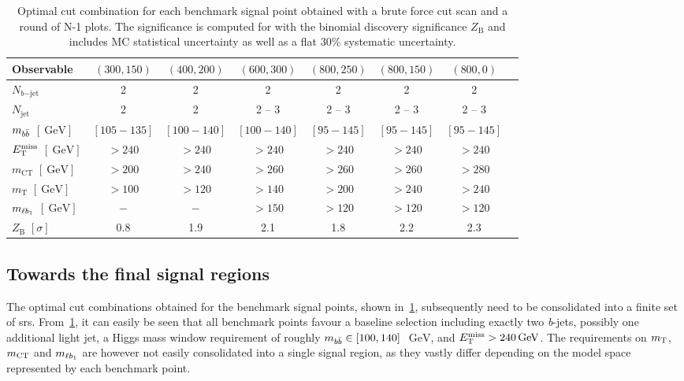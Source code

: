 \begin{table}
	\begin{center}
	\small
			\begin{tabular} {l c c c c c c c}
				\toprule
				Observable &  $(300,150)$ & $(400,200)$ & $(600,300)$  & $(800,250)$ & $(800,150)$ & $(800,0)$ \\
				\midrule
				$N_{b\mathrm{-jet}}$ &  2 & 2 & 2 & 2 & 2 & 2 \\
				$N_\mathrm{jet}$ & 2 & 2 & 2 -- 3 & 2 -- 3  & 2 -- 3 & 2 -- 3\\
				$m_{b\bar{b}}$  $[\SI{}{\GeV}]$& $[105-135]$ & $[100-140]$ & $[100-140]$ & $[95-145]$ & $[95-145]$ & $[95-145]$ \\
				$E_{\textrm{T}}^{\textrm{miss}}$ $[\SI{}{\GeV}]$ & $>240$ & $>240$ & $>240$ & $>240$ & $>240$  & $>240$\\
				$m_\mathrm{CT}$ $[\SI{}{\GeV}]$ &  $>200$ & $>240$ & $>260$ & $>260$ & $>260$   & $>280$ \\
				$m_\mathrm{T}$ $[\SI{}{\GeV}]$ &  $>100$ & $>120$ & $>140$ & $>200$ & $>240$ & $>240$ \\
				$m_{\ell b_{1}}$ $[\SI{}{\GeV}]$ &  $-$ & $-$ & $>150$ & $>120$ & $>120$ & $>120$ \\
				\midrule
				$Z_\mathrm{B}$ $[\sigma]$ & \multicolumn{1}{c}{0.8} & \multicolumn{1}{c}{1.9} & \multicolumn{1}{c}{2.1} & \multicolumn{1}{c}{1.8} & \multicolumn{1}{c}{2.2} & \multicolumn{1}{c}{2.3} \\
				\bottomrule
			\end{tabular}
		\caption{Optimal cut combination for each benchmark signal point obtained with a brute force cut scan and a round of N-1 plots. The significance is computed for \onethirtynineifb with the binomial discovery significance $Z_\mathrm{B}$ and includes MC statistical uncertainty as well as a flat 30\% systematic uncertainty.}
		\label{tab:cut_scan_results}
	\end{center}
\end{table}




\subsection{Towards the final signal regions}\label{sec:towards_signal_regions}

The optimal cut combinations obtained for the benchmark signal points, shown in~\cref{tab:cut_scan_results}, subsequently need to be consolidated into a finite set of \glspl{sr}. From~\cref{tab:cut_scan_results}, it can easily be seen that all benchmark points favour a baseline selection including exactly two \textit{b}-jets, possibly one additional light jet, a Higgs mass window requirement of roughly $m_{b\bar{b}}\in [100,140]$~$\SI{}{\GeV}$, and $\etmiss > \SI{240}{\GeV}$. The requirements on $m_{\textrm{T}}$, $m_{\textrm{CT}}$ and $m_{\ell b_{1}}$ are however not easily consolidated into a single signal region, as they vastly differ depending on the model space represented by each benchmark point.

